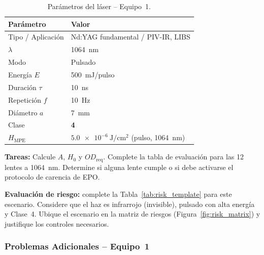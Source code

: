 \documentclass[12pt,a4paper]{article}
\begin{document}
\begin{table}[H]
	\centering
	\caption{Parámetros del láser -- Equipo~1.}
	\small
	\begin{tabular}{l l}
		\toprule
		\textbf{Parámetro} & \textbf{Valor}                                                 \\
		\midrule
		Tipo / Aplicación  & Nd:YAG fundamental / PIV-IR, LIBS                              \\
		$\lambda$          & 1064~nm                                                        \\
		Modo               & Pulsado                                                        \\
		Energía $E$        & 500~mJ/pulso                                                   \\
		Duración $\tau$    & 10~ns                                                          \\
		Repetición $f$     & 10~Hz                                                          \\
		Diámetro $a$       & 7~mm                                                           \\
		\rowcolor{aerored!15}
		Clase              & \textbf{4}                                                     \\
		$H_{\mathrm{MPE}}$ & $\SI{5.0e-6}{\joule\per\centi\metre\squared}$ (pulso, 1064~nm) \\
		\bottomrule
	\end{tabular}
\end{table}

\textbf{Tareas:} Calcule $A$, $H_0$ y $OD_{\mathrm{req}}$. Complete la tabla
de evaluación para las 12 lentes a 1064~nm. Determine si alguna lente cumple o
si debe activarse el protocolo de carencia de EPO.

\textbf{Evaluación de riesgo:} complete la Tabla~\ref{tab:risk_template} para
este escenario. Considere que el haz es infrarrojo (invisible), pulsado con
alta energía y Clase~4. Ubique el escenario en la matriz de riesgos
(Figura~\ref{fig:risk_matrix}) y justifique los controles necesarios.

\subsubsection*{Problemas Adicionales -- Equipo~1}
\end{document}
